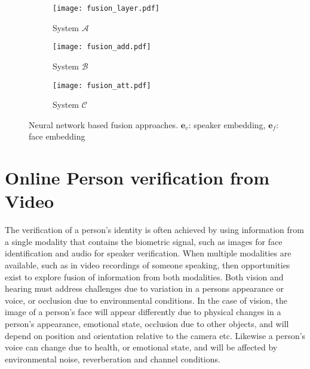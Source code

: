 \documentclass{article}
\begin{document}
\begin{figure*}[ht]
     \centering
     \begin{subfigure}[b]{0.3\textwidth}
         \centering
         \texttt{[image: fusion\_layer.pdf]}\vspace{-3mm}
         \caption{System $\mathcal{A}$}
     \end{subfigure}
     \hfill
     \begin{subfigure}[b]{0.3\textwidth}
         \centering
         \texttt{[image: fusion\_add.pdf]}\vspace{-3mm}
         \caption{System $\mathcal{B}$}
     \end{subfigure}
     \hfill
     \begin{subfigure}[b]{0.3\textwidth}
         \centering
         \texttt{[image: fusion\_att.pdf]}\vspace{-3mm}
         \caption{System $\mathcal{C}$}
     \end{subfigure}
        \caption{Neural network based fusion approaches. $\mathbf{e}_v$: speaker embedding, $\mathbf{e}_f$: face embedding}
        \label{fig:attention}
\end{figure*}


\section{Online Person verification from Video}
The verification of a person's identity is often achieved by using information from a single modality that contains the biometric signal, such as images for face identification and audio for speaker verification.  When multiple modalities are available, such as in video recordings of someone speaking, then opportunities exist to explore fusion of information from both modalities.  
Both vision and hearing must address challenges due to variation in a persons appearance or voice, or occlusion due to environmental conditions.  In the case of vision, the image of a person's face will appear differently due to physical changes in a person's appearance, emotional state, occlusion due to other objects, and will depend on position and orientation relative to the camera etc.  Likewise a person's voice can change due to health, or emotional state, and will be affected by environmental noise, reverberation and channel conditions.  
\end{document}
